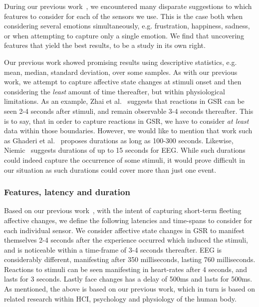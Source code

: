 During our previous work~\cite{9th_semester_project}, we encountered many disparate suggestions to which features to
consider for each of the sensors we use. This is the case both when considering several emotions simultaneously,
e.g. frustration, happiness, sadness, or when attempting to capture only a single emotion. We find that uncovering
features that yield the best results, to be a study in its own right.

Our previous work showed promising results using descriptive statistics, e.g. mean, median, standard deviation, over
some samples. As with our previous work, we attempt to capture affective state changes at stimuli onset and then
considering the \textit{least} amount of time thereafter, but within physiological limitations. As an example, Zhai et
al.~\cite{gsr_len_lat3} suggests that reactions in GSR can be seen 2-4 seconds after stimuli, and remain observable 3-4
seconds thereafter. This is to say, that in order to capture reactions in GSR, we have to consider \textit{at least}
data within those boundaries. However, we would like to mention that work such as Ghaderi et
al.~\cite{machine_learning_100s_gsr} proposes durations as long as 100-300 seconds. Likewise,
Niemic~\cite{studies_of_emotion} suggests durations of up to 15 seconds for EEG. While such durations could indeed
capture the occurrence of some stimuli, it would prove difficult in our situation as such durations could cover more
than just one event.

\subsubsection{Features, latency and duration}
Based on our previous work~\cite{9th_semester_project, first_paper}, with the intent of capturing short-term fleeting affective changes, we define the following
latencies and time-spans to consider for each individual sensor.
We consider affective state changes in GSR to manifest themselves 2-4 seconds after the experience occurred which
induced the stimuli, and is noticeable within a time-frame of 3-4 seconds thereafter. EEG is considerably different,
manifesting after 350 milliseconds, lasting 760 milliseconds. Reactions to stimuli can be seen manifesting in heart-rates
after 4 seconds, and lasts for 3 seconds. Lastly face changes has a delay of 500ms and lasts for 500ms. As mentioned,
the above is based on our previous work, which in turn is based on related research within HCI, psychology and
physiology of the human body.

